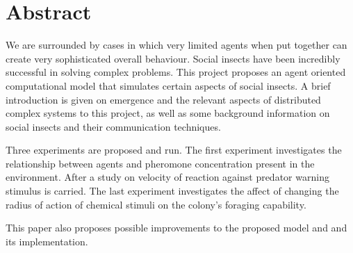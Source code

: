 

\begingroup
\let\clearpage\relax
\let\cleardoublepage\relax
\let\cleardoublepage\relax

\chapter*{Abstract} %

We are surrounded by cases in which very limited agents when put together can create very sophisticated overall behaviour. Social insects have been incredibly successful in solving complex problems. This project proposes an agent oriented computational model that simulates certain aspects of social insects.
A brief introduction is given on emergence and the relevant aspects of distributed complex systems to this project, as well as some background information on social insects and their communication techniques.

Three experiments are proposed and run. The first experiment investigates the relationship between agents and pheromone concentration present in the environment. After a study on velocity of reaction against predator warning stimulus is carried. The last experiment investigates the affect of changing the radius of action of chemical stimuli on the colony's foraging capability.

This paper also proposes possible improvements to the proposed model and and its implementation. 

\endgroup

\vfill